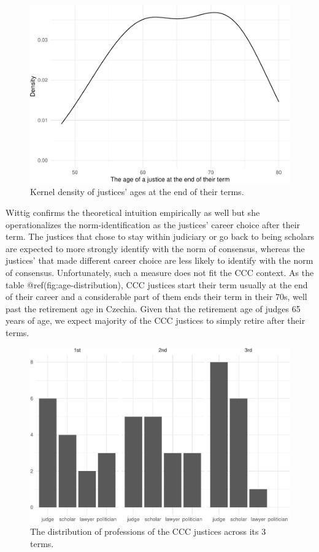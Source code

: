 \documentclass[
  11pt,
]{article}
\begin{document}
\begin{figure}
\centering
\includegraphics{separate_opinions_files/figure-latex/age-distribution-1.pdf}
\caption{Kernel density of justices' ages at the end of their terms.}
\end{figure}

Wittig confirms the theoretical intuition empirically as well but she
operationalizes the norm-identification as the justices' career choice
after their term. The justices that chose to stay within judiciary or go
back to being scholars are expected to more strongly identify with the
norm of consensus, whereas the justices' that made different career
choice are less likely to identify with the norm of consensus.
Unfortunately, such a measure does not fit the CCC context. As the table
@ref(fig:age-distribution), CCC justices start their term usually at the
end of their career and a considerable part of them ends their term in
their 70s, well past the retirement age in Czechia. Given that the
retirement age of judges 65 years of age, we expect majority of the CCC
justices to simply retire after their terms.

\begin{figure}
\centering
\includegraphics{separate_opinions_files/figure-latex/unnamed-chunk-2-1.pdf}
\caption{The distribution of professions of the CCC justices across its
3 terms.}
\end{figure}
\end{document}
